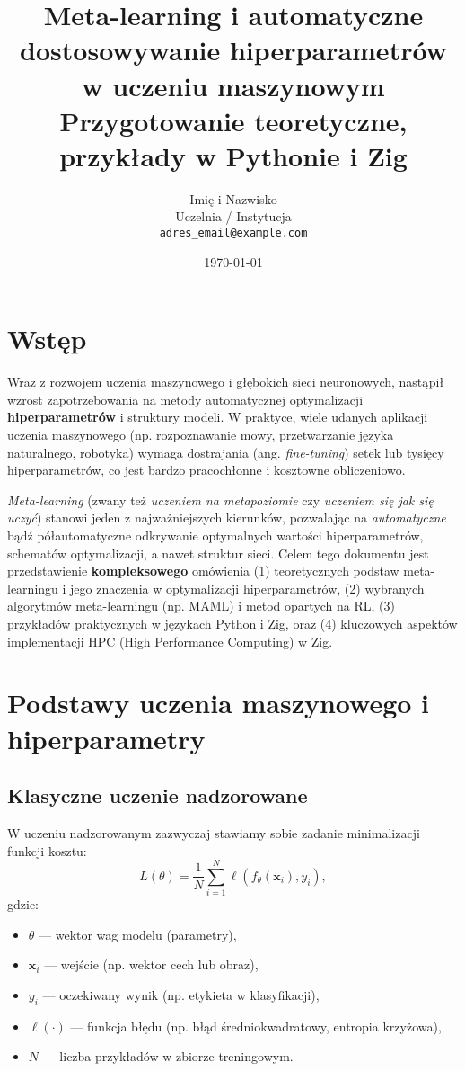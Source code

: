 \documentclass[12pt,a4paper]{article}
\title{\textbf{Meta-learning i automatyczne dostosowywanie hiperparametrów w uczeniu maszynowym}\\
\large{Przygotowanie teoretyczne, przykłady w Pythonie i Zig}}
\author{Imię i Nazwisko \\
\small{Uczelnia / Instytucja}\\
\small{\texttt{adres\_email@example.com}}}
\date{\today}
\begin{document}
\maketitle
\tableofcontents

\section*{Wstęp}

Wraz z rozwojem uczenia maszynowego i głębokich sieci neuronowych, nastąpił wzrost zapotrzebowania na metody automatycznej optymalizacji \textbf{hiperparametrów} i struktury modeli. W praktyce, wiele udanych aplikacji uczenia maszynowego (np. rozpoznawanie mowy, przetwarzanie języka naturalnego, robotyka) wymaga dostrajania (ang. \emph{fine-tuning}) setek lub tysięcy hiperparametrów, co jest bardzo pracochłonne i kosztowne obliczeniowo. 

\emph{Meta-learning} (zwany też \emph{uczeniem na metapoziomie} czy \emph{uczeniem się jak się uczyć}) stanowi jeden z najważniejszych kierunków, pozwalając na \emph{automatyczne} bądź półautomatyczne odkrywanie optymalnych wartości hiperparametrów, schematów optymalizacji, a nawet struktur sieci. Celem tego dokumentu jest przedstawienie \textbf{kompleksowego} omówienia (1) teoretycznych podstaw meta-learningu i jego znaczenia w optymalizacji hiperparametrów, (2) wybranych algorytmów meta-learningu (np. MAML) i metod opartych na RL, (3) przykładów praktycznych w językach Python i Zig, oraz (4) kluczowych aspektów implementacji HPC (High Performance Computing) w Zig.

\newpage
\section{Podstawy uczenia maszynowego i hiperparametry}

\subsection{Klasyczne uczenie nadzorowane}

W uczeniu nadzorowanym zazwyczaj stawiamy sobie zadanie minimalizacji funkcji kosztu:
\begin{equation}
    L(\theta) = \frac{1}{N}\sum_{i=1}^{N} \ell(f_\theta(\mathbf{x}_i), y_i),
\end{equation}
gdzie:
\begin{itemize}
    \item \(\theta\) — wektor wag modelu (parametry),
    \item \(\mathbf{x}_i\) — wejście (np. wektor cech lub obraz),
    \item \(y_i\) — oczekiwany wynik (np. etykieta w klasyfikacji),
    \item \(\ell(\cdot)\) — funkcja błędu (np. błąd średniokwadratowy, entropia krzyżowa),
    \item \(N\) — liczba przykładów w zbiorze treningowym.
\end{itemize}
\end{document}
